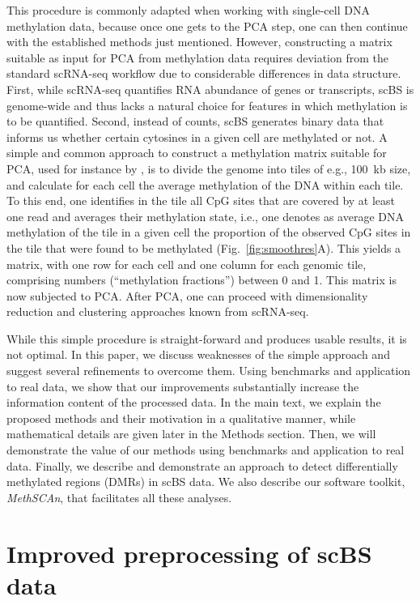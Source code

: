 \documentclass[twocolumn,10pt]{article}
\begin{document}
This procedure is commonly adapted when working with single-cell DNA methylation data, because once one gets to the PCA step, one can then continue with the established methods just mentioned.
However, constructing a matrix suitable as input for PCA from methylation data requires deviation from the standard scRNA-seq workflow due to considerable differences in data structure.
First, while scRNA-seq quantifies RNA abundance of genes or transcripts, scBS is genome-wide and thus lacks a natural choice for features in which methylation is to be quantified.
Second, instead of counts, scBS generates binary data that informs us whether certain cytosines in a given cell are methylated or not.
A simple and common approach to construct a methylation matrix suitable for PCA, used for instance by \citet{luo2017single}, is to divide the genome into tiles of e.g., 100~kb size, and calculate for each cell the average methylation of the DNA within each tile.
To this end, one identifies in the tile all CpG sites that are covered by at least one read and averages their methylation state, i.e., one denotes as average DNA methylation of the tile in a given cell the proportion of the observed CpG sites in the tile that were found to be methylated (Fig.~\ref{fig:smoothres}A).
This yields a matrix, with one row for each cell and one column for each genomic tile, comprising numbers (``methylation fractions'') between 0 and 1.
This matrix is now subjected to PCA.
After PCA, one can proceed with dimensionality reduction and clustering approaches known from scRNA-seq.

While this simple procedure is straight-forward and produces usable results, it is not optimal.
In this paper, we discuss weaknesses of the simple approach and suggest several refinements to overcome them.
Using benchmarks and application to real data, we show that our improvements substantially increase the information content of the processed data.
In the main text, we explain the proposed methods and their motivation in a qualitative manner, while mathematical details are given later in the Methods section.
Then, we will demonstrate the value of our methods using benchmarks and application to real data.
Finally, we describe and demonstrate an approach to detect differentially methylated regions (DMRs) in scBS data.
We also describe our software toolkit, \textit{MethSCAn}, that facilitates all these analyses.

\section{Improved preprocessing of scBS data}
\end{document}

